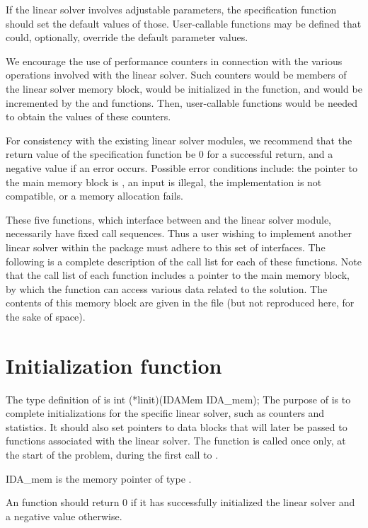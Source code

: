 If the linear solver involves adjustable parameters, the specification
function should set the default values of those.  User-callable
functions may be defined that could, optionally, override the default
parameter values.

We encourage the use of performance counters in connection with the various
operations involved with the linear solver.  Such counters would be
members of the linear solver memory block, would be initialized in the
 function, and would be incremented by the  and
 functions.  Then, user-callable functions would be needed to
obtain the values of these counters.

For consistency with the existing {\ida} linear solver modules, we
recommend that the return value of the specification function be 0 for
a successful return, and a negative value if an error occurs.
Possible error conditions include: the pointer to the main {\ida}
memory block is , an input is illegal, the {\nvector}
implementation is not compatible, or a memory allocation fails.

\vspace{0.1in}
These five functions, which interface between {\ida} and the linear solver module,
necessarily have fixed call sequences.  Thus a user wishing to implement another 
linear solver within the {\ida} package must adhere to this set of interfaces.
The following is a complete description of the call list for each of
these functions.  Note that the call list of each function includes a
pointer to the main {\ida} memory block, by which the function can access
various data related to the {\ida} solution.  The contents of this memory
block are given in the file  (but not reproduced here, for
the sake of space).


\section{Initialization function}
The type definition of  is
{
  int (*linit)(IDAMem IDA\_mem);
}
{
  The purpose of  is to complete initializations for
  the specific linear solver, such as counters and statistics.
  It should also set pointers to data blocks that will later be
  passed to functions associated with the linear solver.
  The  function is called once only, at the start of
  the problem, during the first call to .
}
{
  \begin{args}
  \item[IDA\_mem]
    is the {\ida} memory pointer of type .
  \end{args}
}
{
  An  function should return 0 if it 
  has successfully initialized the {\ida} linear solver and 
  a negative value otherwise. 
}
{}

